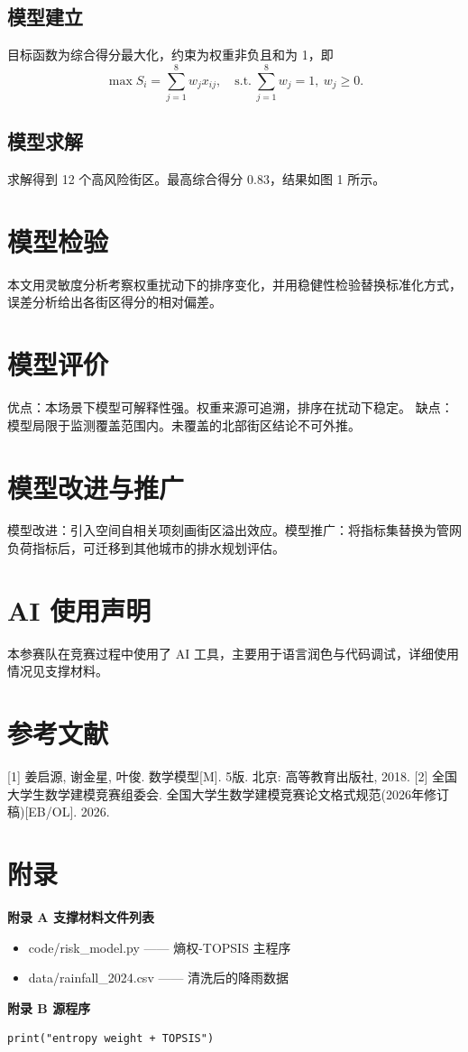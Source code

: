 \documentclass[12pt]{article}
\begin{document}
\subsection{模型建立}
目标函数为综合得分最大化，约束为权重非负且和为 1，即
\begin{equation}
\max S_i=\sum_{j=1}^{8} w_j x_{ij},\quad \text{s.t.}\ \sum_{j=1}^{8} w_j=1,\ w_j\ge 0 .
\end{equation}

\subsection{模型求解}
求解得到 12 个高风险街区。最高综合得分 0.83，结果如图 1 所示。

\section{模型检验}
本文用灵敏度分析考察权重扰动下的排序变化，并用稳健性检验替换标准化方式，误差分析给出各街区得分的相对偏差。

\section{模型评价}
优点：本场景下模型可解释性强。权重来源可追溯，排序在扰动下稳定。
缺点：模型局限于监测覆盖范围内。未覆盖的北部街区结论不可外推。

\section{模型改进与推广}
模型改进：引入空间自相关项刻画街区溢出效应。模型推广：将指标集替换为管网负荷指标后，可迁移到其他城市的排水规划评估。

\section*{AI 使用声明}
本参赛队在竞赛过程中使用了 AI 工具，主要用于语言润色与代码调试，详细使用情况见支撑材料。

\section*{参考文献}
[1] 姜启源, 谢金星, 叶俊. 数学模型[M]. 5版. 北京: 高等教育出版社, 2018.
[2] 全国大学生数学建模竞赛组委会. 全国大学生数学建模竞赛论文格式规范(2026年修订稿)[EB/OL]. 2026.

\section*{附录}
\textbf{附录 A 支撑材料文件列表}
\begin{itemize}
\item code/risk\_model.py —— 熵权-TOPSIS 主程序
\item data/rainfall\_2024.csv —— 清洗后的降雨数据
\end{itemize}
\textbf{附录 B 源程序}
\begin{lstlisting}
print("entropy weight + TOPSIS")
\end{lstlisting}
\end{document}
